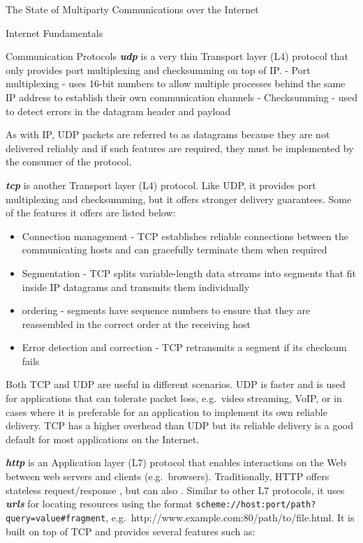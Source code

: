 \begin{frame}[fragile]{The State of Multiparty Communications over the
Internet}
\begin{block}{Internet Fundamentals}
\begin{block}{Communication Protocols}
\textbf{\emph{\acrfull{udp}}} is a very thin Transport layer (L4)
protocol that only provides port multiplexing and checksumming on top of
IP. - Port multiplexing - uses 16-bit numbers to allow multiple
processes behind the same IP address to establish their own
communication channels - Checksumming - used to detect errors in the
datagram header and payload

As with IP, UDP packets are referred to as datagrams because they are
not delivered reliably and if such features are required, they must be
implemented by the consumer of the protocol.

\textbf{\emph{\acrfull{tcp}}} is another Transport layer (L4) protocol.
Like UDP, it provides port multiplexing and checksumming, but it offers
stronger delivery guarantees. Some of the features it offers are listed
below:

\begin{itemize}
\tightlist
\item
  Connection management - TCP establishes reliable connections between
  the communicating hosts and can gracefully terminate them when
  required
\item
  Segmentation - TCP splits variable-length data streams into segments
  that fit inside IP datagrams and transmits them individually
\item
  ordering - segments have sequence numbers to ensure that they are
  reassembled in the correct order at the receiving host
\item
  Error detection and correction - TCP retransmits a segment if its
  checksum fails
\end{itemize}

Both TCP and UDP are useful in different scenarios. UDP is faster and is
used for applications that can tolerate packet loss, e.g.~video
streaming, VoIP, or in cases where it is preferable for an application
to implement its own reliable delivery. TCP has a higher overhead than
UDP but its reliable delivery is a good default for most applications on
the Internet.


\textbf{\emph{\gls{http}}} is an Application layer (L7) protocol that
enables interactions on the Web between web servers and clients
(e.g.~browsers). Traditionally, HTTP offers stateless request/response ,
but can also . Similar to other L7 protocols, it uses
\textbf{\emph{\glspl{url}}} for locating resources using the format
\texttt{scheme://host:port/path?query=value\#fragment},
e.g.~http://www.example.com:80/path/to/file.html. It is built on top of
TCP and provides several features such as:


\end{block}
\end{block}
\end{frame}
